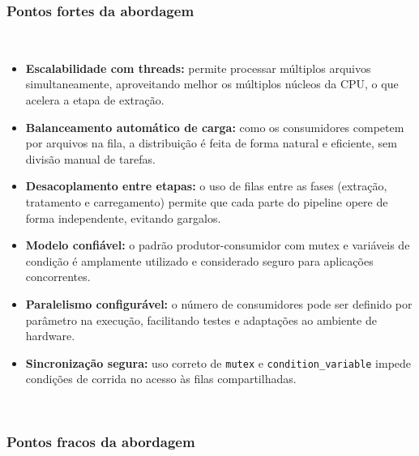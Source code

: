 \documentclass[a4paper,12pt]{article}
\begin{document}
\subsubsection*{Pontos fortes da abordagem}
\\
\begin{itemize}
    \item \textbf{Escalabilidade com threads:} permite processar múltiplos arquivos simultaneamente, aproveitando melhor os múltiplos núcleos da CPU, o que acelera a etapa de extração.

    \item \textbf{Balanceamento automático de carga:} como os consumidores competem por arquivos na fila, a distribuição é feita de forma natural e eficiente, sem divisão manual de tarefas.

    \item \textbf{Desacoplamento entre etapas:} o uso de filas entre as fases (extração, tratamento e carregamento) permite que cada parte do pipeline opere de forma independente, evitando gargalos.

    \item \textbf{Modelo confiável:} o padrão produtor-consumidor com mutex e variáveis de condição é amplamente utilizado e considerado seguro para aplicações concorrentes.

    \item \textbf{Paralelismo configurável:} o número de consumidores pode ser definido por parâmetro na execução, facilitando testes e adaptações ao ambiente de hardware.

    \item \textbf{Sincronização segura:} uso correto de \texttt{mutex} e \texttt{condition\_variable} impede condições de corrida no acesso às filas compartilhadas.
\end{itemize}

\vspace{1em}

\\
\subsubsection*{Pontos fracos da abordagem}
\end{document}
